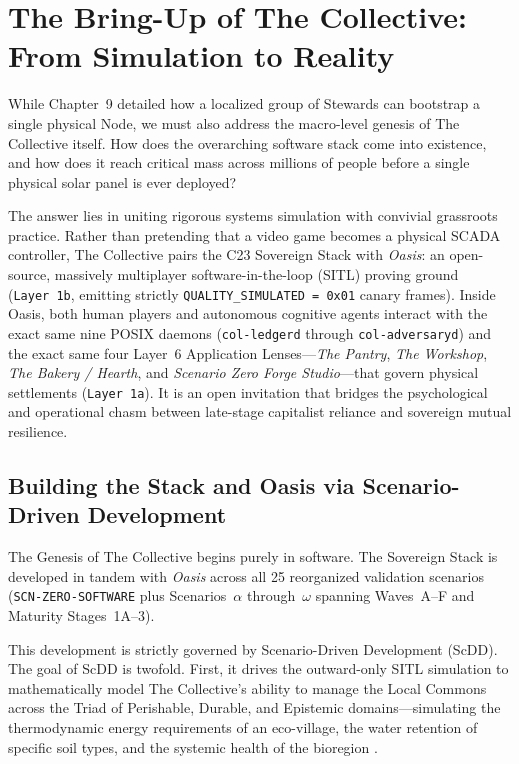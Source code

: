 \chapter{The Bring-Up of The Collective: From Simulation to Reality}

While Chapter~9 detailed how a localized group of Stewards can bootstrap a single physical Node, we must also address the macro-level genesis of The Collective itself. How does the overarching software stack come into existence, and how does it reach critical mass across millions of people before a single physical solar panel is ever deployed?

The answer lies in uniting rigorous systems simulation with convivial grassroots practice. Rather than pretending that a video game becomes a physical SCADA controller, The Collective pairs the C23 Sovereign Stack with \textit{Oasis}: an open-source, massively multiplayer software-in-the-loop (SITL) proving ground (\texttt{Layer~1b}, emitting strictly \texttt{QUALITY\_SIMULATED = 0x01} canary frames). Inside Oasis, both human players and autonomous cognitive agents interact with the exact same nine POSIX daemons (\texttt{col-ledgerd} through \texttt{col-adversaryd}) and the exact same four Layer~6 Application Lenses---\textit{The Pantry}, \textit{The Workshop}, \textit{The Bakery / Hearth}, and \textit{Scenario Zero Forge Studio}---that govern physical settlements (\texttt{Layer~1a}). It is an open invitation that bridges the psychological and operational chasm between late-stage capitalist reliance and sovereign mutual resilience.

\section{Building the Stack and Oasis via Scenario-Driven Development}

The Genesis of The Collective begins purely in software. The Sovereign Stack is developed in tandem with \textit{Oasis} across all 25 reorganized validation scenarios (\texttt{SCN-ZERO-SOFTWARE} plus Scenarios~$\alpha$ through~$\omega$ spanning Waves~A--F and Maturity Stages~1A--3). 

This development is strictly governed by Scenario-Driven Development (ScDD). The goal of ScDD is twofold. First, it drives the outward-only SITL simulation to mathematically model The Collective's ability to manage the Local Commons across the Triad of Perishable, Durable, and Epistemic domains---simulating the thermodynamic energy requirements of an eco-village, the water retention of specific soil types, and the systemic health of the bioregion \parencite{jorgensen2001thermodynamics}. 

